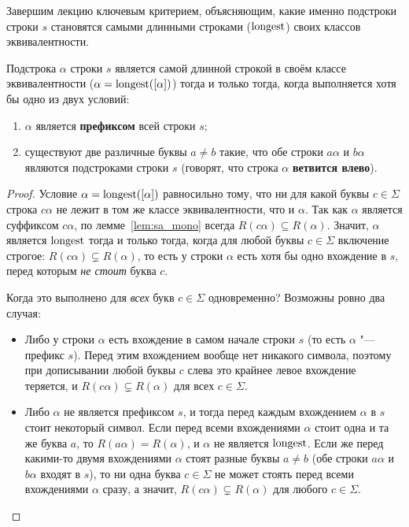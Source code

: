 Завершим лекцию ключевым критерием, объясняющим, какие именно подстроки строки $s$ становятся самыми длинными строками ($\operatorname{longest}$) своих классов эквивалентности.

\begin{lemma}\label{lem:longest_crit}
    Подстрока $\alpha$ строки $s$ является самой длинной строкой в своём классе эквивалентности ($\alpha = \operatorname{longest}([\alpha])$) тогда и только тогда, когда выполняется хотя бы одно из двух условий:
    \begin{enumerate}
        \item $\alpha$ является \textbf{префиксом} всей строки $s$;
        \item существуют две различные буквы $a \ne b$ такие, что обе строки $a\alpha$ и $b\alpha$ являются подстроками строки $s$ (говорят, что строка $\alpha$ \textbf{ветвится влево}).
    \end{enumerate}
\end{lemma}

\begin{proof}
    Условие $\alpha = \operatorname{longest}([\alpha])$ равносильно тому, что ни для какой буквы $c \in \Sigma$ строка $c\alpha$ не лежит в том же классе эквивалентности, что и $\alpha$. Так как $\alpha$ является суффиксом $c\alpha$, по лемме~\ref{lem:sa_mono} всегда $R(c\alpha) \subseteq R(\alpha)$. Значит, $\alpha$ является $\operatorname{longest}$ тогда и только тогда, когда для любой буквы $c \in \Sigma$ включение строгое: $R(c\alpha) \subsetneq R(\alpha)$, то есть у строки $\alpha$ есть хотя бы одно вхождение в $s$, перед которым \emph{не стоит} буква $c$.

    Когда это выполнено для \emph{всех} букв $c \in \Sigma$ одновременно? Возможны ровно два случая:
    \begin{itemize}
        \item Либо у строки $\alpha$ есть вхождение в самом начале строки $s$ (то есть $\alpha$ "--- префикс $s$). Перед этим вхождением вообще нет никакого символа, поэтому при дописывании любой буквы $c$ слева это крайнее левое вхождение теряется, и $R(c\alpha) \subsetneq R(\alpha)$ для всех $c \in \Sigma$.
        \item Либо $\alpha$ не является префиксом $s$, и тогда перед каждым вхождением $\alpha$ в $s$ стоит некоторый символ. Если перед всеми вхождениями $\alpha$ стоит одна и та же буква $a$, то $R(a\alpha) = R(\alpha)$, и $\alpha$ не является $\operatorname{longest}$. Если же перед какими-то двумя вхождениями $\alpha$ стоят разные буквы $a \ne b$ (обе строки $a\alpha$ и $b\alpha$ входят в $s$), то ни одна буква $c \in \Sigma$ не может стоять перед всеми вхождениями $\alpha$ сразу, а значит, $R(c\alpha) \subsetneq R(\alpha)$ для любого $c \in \Sigma$.
    \end{itemize}
\end{proof}
